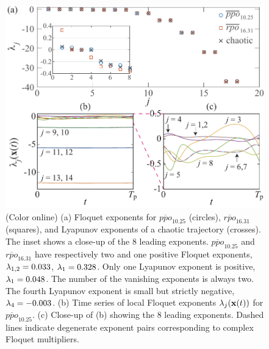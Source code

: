 \documentclass[prl,aps,preprint,showpacs,superscriptaddress]{revtex4-1} %
\begin{document}
\begin{figure}[t!]
  \includegraphics[width=\hsize,clip]{ks22FloqExp}
  \caption{
    (Color online)
    (a) Floquet exponents for $\overline{ppo}_{10.25}$ (circles),
    $\overline{rpo}_{16.31}$ (squares), and Lyapunov exponents of a
    chaotic trajectory (crosses).
    The inset shows a close-up of the 8 leading exponents.
    $\overline{ppo}_{10.25}$ and $\overline{rpo}_{16.31}$ have
    respectively two and one positive Floquet exponents,
    $\eigRe[1,2]{}=0.033$, $\eigRe[1]{}=0.328$.
    Only one Lyapunov exponent is positive,
    $\eigRe[1]=0.048$.
    The number of the vanishing exponents is always two. The fourth
    Lyapunov exponent is small but strictly negative,  $\eigRe[4]=-0.003$.
    (b) Time series of local Floquet exponents
    $\lambda_j(\mathrm{\mathbf{x}}(t))$ for $\overline{ppo}_{10.25}$.
    (c) Close-up of (b) showing the 8 leading exponents.
    Dashed lines indicate degenerate exponent pairs corresponding to
    complex Floquet multipliers.
  }
  \label{fig:ks22FloqExp}
\end{figure}
\end{document}
